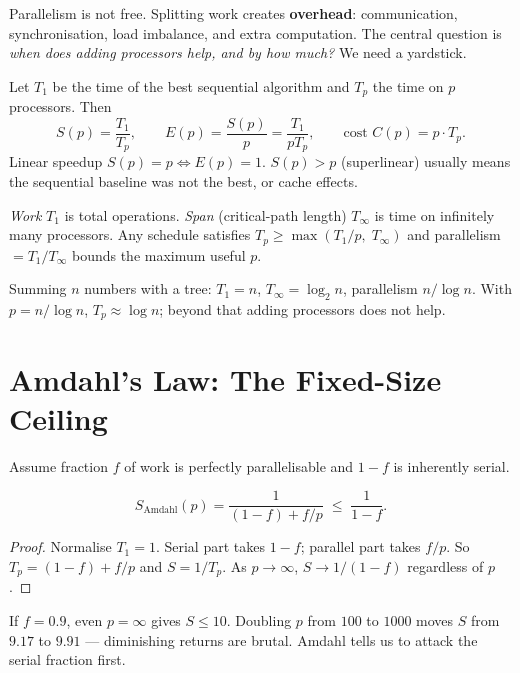 Parallelism is not free. Splitting work creates \textbf{overhead}: communication, synchronisation, load imbalance, and extra computation. The central question is \emph{when does adding processors help, and by how much?} We need a yardstick.

\begin{definition}\label{def:speedup}
Let $T_{1}$ be the time of the best sequential algorithm and $T_{p}$ the time on $p$ processors. Then
\[ S(p)=\frac{T_{1}}{T_{p}},\qquad E(p)=\frac{S(p)}{p}=\frac{T_{1}}{pT_{p}},\qquad \text{cost }C(p)=p\cdot T_{p}. \]
Linear speedup $S(p)=p\iff E(p)=1$. $S(p)>p$ (superlinear) usually means the sequential baseline was not the best, or cache effects.
\end{definition}

\begin{definition}\label{def:workspan}
\textit{Work} $T_{1}$ is total operations. \textit{Span} (critical-path length) $T_{\infty}$ is time on infinitely many processors. Any schedule satisfies $T_{p}\ge \max(T_{1}/p,\;T_{\infty})$ and parallelism $=T_{1}/T_{\infty}$ bounds the maximum useful $p$.
\end{definition}

\begin{example}
Summing $n$ numbers with a tree: $T_{1}=n$, $T_{\infty}=\log_{2}n$, parallelism $n/\log n$. With $p=n/\log n$, $T_{p}\approx\log n$; beyond that adding processors does not help.
\end{example}

\section{Amdahl's Law: The Fixed-Size Ceiling}
Assume fraction $f$ of work is perfectly parallelisable and $1-f$ is inherently serial.

\begin{theorem}\label{thm:amdahl}
\[ S_{\text{Amdahl}}(p)=\frac{1}{(1-f)+f/p}\;\le\;\frac{1}{1-f}. \]
\end{theorem}
\begin{proof}
Normalise $T_{1}=1$. Serial part takes $1-f$; parallel part takes $f/p$. So $T_{p}=(1-f)+f/p$ and $S=1/T_{p}$. As $p\to\infty$, $S\to1/(1-f)$ regardless of $p$.
\end{proof}

If $f=0.9$, even $p=\infty$ gives $S\le10$. Doubling $p$ from $100$ to $1000$ moves $S$ from $9.17$ to $9.91$ --- diminishing returns are brutal. Amdahl tells us to attack the serial fraction first.

